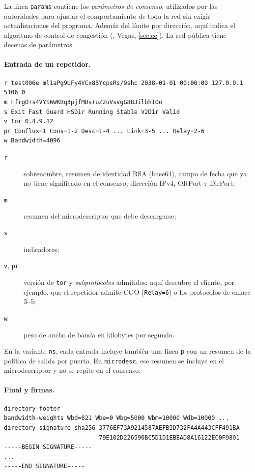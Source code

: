La línea \texttt{params} contiene los \emph{parámetros de consenso}, utilizados por las autoridades para ajustar el comportamiento de toda la red sin exigir actualizaciones del programa. Además del límite por dirección, aquí indica el algoritmo de control de congestión (, Vegas, \cref{sec:cc}). La red pública tiene decenas de parámetros.

\paragraph{Entrada de un repetidor.}
\begin{lstlisting}[numbers=none]
r test006e ml1aPg9UFy4VCx85YcpsRs/9shc 2038-01-01 00:00:00 127.0.0.1 5106 0
m FfrgO+s4VYS6WKBq3pjfMDs+uZ2uVsvgG88JilbhIOo
s Exit Fast Guard HSDir Running Stable V2Dir Valid
v Tor 0.4.9.12
pr Conflux=1 Cons=1-2 Desc=1-4 ... Link=3-5 ... Relay=2-6
w Bandwidth=4096
\end{lstlisting}

\begin{description}
  \item[\texttt{r}] sobrenombre, resumen de identidad RSA (base64), campo de fecha que ya no tiene significado en el consenso, dirección IPv4, ORPort y DirPort;
  \item[\texttt{m}] resumen del microdescriptor que debe descargarse;
  \item[\texttt{s}] indicadores;
  \item[\texttt{v}, \texttt{pr}] versión de \texttt{tor} y \emph{subprotocolos} admitidos: aquí descubre el cliente, por ejemplo, que el repetidor admite CGO (\texttt{Relay=6}) o los protocolos de enlace 3--5;
  \item[\texttt{w}] peso de ancho de banda en kilobytes por segundo.
\end{description}

En la variante \texttt{ns}, cada entrada incluye también una línea \texttt{p} con un resumen de la política de salida por puerto. En \texttt{microdesc}, ese resumen se incluye en el microdescriptor y no se repite en el consenso.

\paragraph{Final y firmas.}
\begin{lstlisting}[numbers=none]
directory-footer
bandwidth-weights Wbd=821 Wbe=0 Wbg=5000 Wbm=10000 Wdb=10000 ...
directory-signature sha256 3776EF73A9214587AEFB3D732FA4A443CFF491BA
                           79E102D226590BC5D1D1EBBAD8A16122EC0F9801
-----BEGIN SIGNATURE-----
...
-----END SIGNATURE-----
\end{lstlisting}

